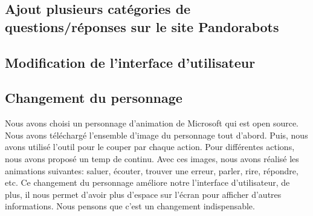 \subsection{Ajout plusieurs catégories de questions/réponses sur le site Pandorabots}

\subsection{Modification de l'interface d'utilisateur}


\subsection{Changement du personnage}
\indent Nous avons choisi un personnage d'animation de Microsoft qui est open source. Nous avons téléchargé l'ensemble d'image du personnage tout d'abord. Puis, nous avons utilisé l'outil pour le couper par chaque action. Pour différentes actions, nous avons proposé un temp de continu. Avec ces images, nous avons réalisé les animations  suivantes: saluer, écouter, trouver une  erreur, parler, rire, répondre, etc. Ce changement du personnage améliore notre l'interface d'utilisateur, de plus, il nous permet d'avoir plus d'espace sur l'écran pour afficher d'autres informations. Nous pensons que c'est un changement indispensable.